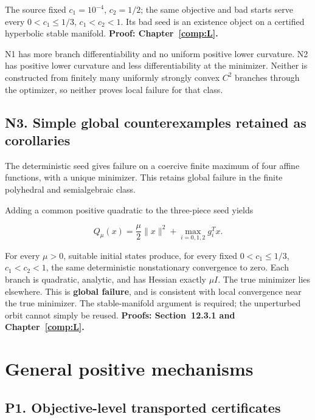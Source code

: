 The source fixed \(c_1=10^{-4}\), \(c_2=1/2\); the same objective and bad starts serve every \(0<c_1\le1/3\), \(c_1<c_2<1\). Its bad seed is an existence object on a certified hyperbolic stable manifold. \textbf{Proof: Chapter~\ref{comp:L}.}

N1 has more branch differentiability and no uniform positive lower curvature. N2 has positive lower curvature and less differentiability at the minimizer. Neither is constructed from finitely many uniformly strongly convex \(C^2\) branches through the optimizer, so neither proves local failure for that class.



\subsection{N3. Simple global counterexamples retained as corollaries}\label{n3.-simple-global-counterexamples-retained-as-corollaries}

The deterministic seed gives failure on a coercive finite maximum of four affine functions, with a unique minimizer. This retains global failure in the finite polyhedral and semialgebraic class.

Adding a common positive quadratic to the three-piece seed yields

\[
 Q_\mu(x)=\frac\mu2\|x\|^2+\max_{i=0,1,2}g_i^Tx.
\]

For every \(\mu>0\), suitable initial states produce, for every fixed \(0<c_1\le1/3\), \(c_1<c_2<1\), the same deterministic nonstationary convergence to zero. Each branch is quadratic, analytic, and has Hessian exactly \(\mu I\). The true minimizer lies elsewhere. This is \textbf{global failure}, and is consistent with local convergence near the true minimizer. The stable-manifold argument is required; the unperturbed orbit cannot simply be reused. \textbf{Proofs: Section~12.3.1 and Chapter~\ref{comp:L}.}



\section{General positive mechanisms}\label{general-positive-mechanisms-retain-distinct-hypotheses}



\subsection{P1. Objective-level transported certificates}\label{p1.-objective-level-transported-certificates}


